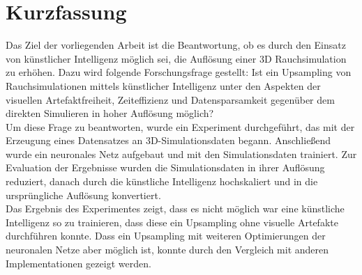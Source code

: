 \chapter*{Kurzfassung}
\thispagestyle{plain}

Das Ziel der vorliegenden Arbeit ist die Beantwortung, ob es durch den Einsatz von künstlicher Intelligenz möglich sei, die Auflösung einer 3D Rauchsimulation zu erhöhen. Dazu wird folgende Forschungsfrage gestellt: Ist ein Upsampling von Rauchsimulationen mittels künstlicher Intelligenz unter den Aspekten der visuellen Artefaktfreiheit, Zeiteffizienz und Datensparsamkeit gegenüber
dem direkten Simulieren in hoher Auflösung möglich?\\

Um diese Frage zu beantworten, wurde ein Experiment durchgeführt, das mit der Erzeugung eines Datensatzes an 3D-Simulationsdaten begann. Anschließend wurde ein neuronales Netz aufgebaut und mit den Simulationsdaten trainiert. Zur Evaluation der Ergebnisse wurden die Simulationsdaten in ihrer Auflösung reduziert, danach durch die künstliche Intelligenz hochskaliert und in die ursprüngliche Auflösung konvertiert.\\

Das Ergebnis des Experimentes zeigt, dass es nicht möglich war eine künstliche Intelligenz so zu trainieren, dass diese ein Upsampling ohne visuelle Artefakte durchführen konnte. Dass ein Upsampling mit weiteren Optimierungen der neuronalen Netze aber möglich ist, konnte durch den Vergleich mit anderen Implementationen gezeigt werden.\\